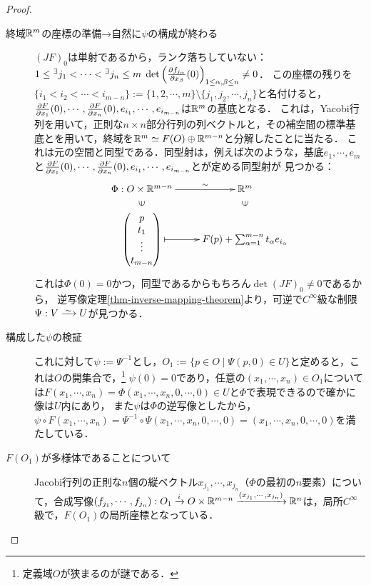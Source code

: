 \documentclass[uplatex,dvipdfmx]{jsreport}
\begin{document}
\begin{proof}\mbox{}
    \begin{description}
        \item[終域$\mathbb{R}^m$の座標の準備→自然に$\psi$の構成が終わる] 
        $(JF)_0$は単射であるから，ランク落ちしていない：$1\le{}^\exists j_1<\cdots<{}^\exists j_n\le m\;\det\left(\frac{\partial f_{j_\alpha}}{\partial x_\beta}(0)\right)_{1\le\alpha,\beta\le n}\ne 0$．
        この座標の残りを$\{i_1<i_2<\cdots<i_{m-n}\}:=\{1,2,\cdots,m\}\setminus\{j_1,j_2,\cdots,j_n\}$と名付けると，$\frac{\partial F}{\partial x_1}(0),\cdots,\frac{\partial F}{\partial x_n}(0),e_{i_1},\cdots,e_{i_{m-n}}$は$\mathbb{R}^m$の基底となる．
        これは，Yacobi行列を用いて，正則な$n\times n$部分行列の列ベクトルと，その補空間の標準基底とを用いて，終域を$\mathbb{R}^m\simeq F(O)\oplus\mathbb{R}^{m-n}$と分解したことに当たる．
        これは元の空間と同型である．同型射は，例えば次のような，基底$e_1,\cdots,e_m$と$\frac{\partial F}{\partial x_1}(0),\cdots,\frac{\partial F}{\partial x_n}(0),e_{i_1},\cdots,e_{i_{m-n}}$とが定める同型射が
        見つかる：
        \[\xymatrix@R-2pc{
            \Phi:O\times\R^{m-n}\ar[r]^-{\sim}&\R^m\\
            \rotatebox[origin=c]{90}{$\in$}&\rotatebox[origin=c]{90}{$\in$}\\
            {\begin{pmatrix}p\\t_1\\\vdots\\t_{m-n}\end{pmatrix}}\ar@{|->}[r]&F(p)+\sum^{m-n}_{\alpha=1}t_{\alpha}e_{i_\alpha}
        }\]
        これは$\Phi(0)=0$かつ，同型であるからもちろん$\det(JF)_0\ne0$であるから，
        逆写像定理\ref{thm-inverse-mapping-theorem}より，可逆で$C^\infty$級な制限$\Psi:V\iso U$が見つかる．
        \item[構成した$\psi$の検証]
        これに対して$\psi:=\Psi^{-1}$とし，$O_1:=\{p\in O\mid\Psi(p,0)\in U\}$と定めると，これは$O$の開集合で，\footnote{定義域$O$が狭まるのが謎である．}
        $\psi(0)=0$であり，任意の$(x_1,\cdots,x_n)\in O_1$については$F(x_1,\cdots,x_n)=\Phi(x_1,\cdots,x_n,0,\cdots,0)\in U$と$\Phi$で表現できるので確かに像は$U$内にあり，
        また$\psi$は$\Phi$の逆写像としたから，$\psi\circ F(x_1,\cdots,x_n)=\Psi^{-1}\circ\Psi(x_1,\cdots,x_n,0,\cdots,0)=(x_1,\cdots,x_n,0,\cdots,0)$を満たしている．
        \item[$F(O_1)$が多様体であることについて]
        Jacobi行列の正則な$n$個の縦ベクトル$x_{j_1},\cdots,x_{j_n}$（$\Phi$の最初の$n$要素）について，合成写像$(f_{j_1},\cdots,f_{j_n}):O_1\xrightarrow{i}O\times\mathbb{R}^{m-n}\xrightarrow{(x_{j_1},\cdots,x_{j_n})}\mathbb{R}^n$は，局所$C^\infty$級で，$F(O_1)$の局所座標となっている．
    \end{description}
\end{proof}
\end{document}
